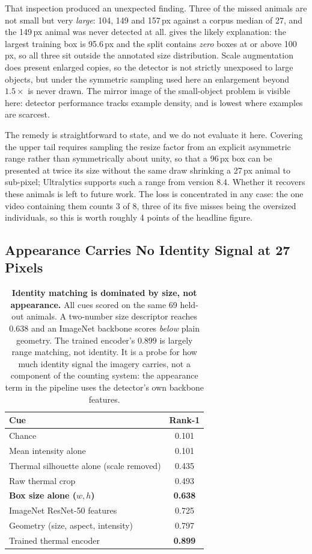 That inspection produced an unexpected finding. Three of the missed animals are not small but
very \emph{large}: 104, 149 and 157\,px against a corpus median of 27, and the 149\,px animal
was never detected at all.  gives the likely explanation: the largest
training box is 95.6\,px and the split contains \emph{zero} boxes at or above 100\,px, so all
three sit outside the annotated size distribution. Scale augmentation does present enlarged
copies, so the detector is not strictly unexposed to large objects, but under the symmetric
sampling used here an enlargement beyond $1.5\times$ is never drawn. The mirror image of the
small-object problem is visible here: detector performance tracks example density, and is lowest where examples are scarcest.

The remedy is straightforward to state, and we do not evaluate it here. Covering the upper
tail requires sampling the resize factor from an explicit asymmetric range rather than
symmetrically about unity, so that a 96\,px box can be presented at twice its size without
the same draw shrinking a 27\,px animal to sub-pixel; Ultralytics supports such a range from
version 8.4. Whether it recovers these animals is left to future work. The loss is
concentrated in any case: the one video containing them counts 3 of 8, three of its five
misses being the oversized individuals, so this is worth roughly 4 points of the headline
figure.

\subsection{Appearance Carries No Identity Signal at 27 Pixels}
\label{sec:reid}

\begin{table}[H]
\caption{\textbf{Identity matching is dominated by size, not appearance.} All cues scored on
the same 69 held-out animals. A two-number size descriptor reaches 0.638 and an ImageNet
backbone scores \emph{below} plain geometry. The trained encoder's 0.899 is largely range
matching, not identity. It is a probe for how much identity signal the imagery carries, not
a component of the counting system: the appearance term in the pipeline uses the detector's
own backbone features.\label{tab:reid}}
\centering
\begin{tabularx}{\textwidth}{lC}
\toprule
\textbf{Cue} & \textbf{Rank-1} \\
\midrule
Chance & 0.101 \\
Mean intensity alone & 0.101 \\
Thermal silhouette alone (scale removed) & 0.435 \\
Raw thermal crop & 0.493 \\
\textbf{Box size alone ($w,h$)} & \textbf{0.638} \\
ImageNet ResNet-50 features & 0.725 \\
Geometry (size, aspect, intensity) & 0.797 \\
Trained thermal encoder & \textbf{0.899} \\
\bottomrule
\end{tabularx}
\end{table}


